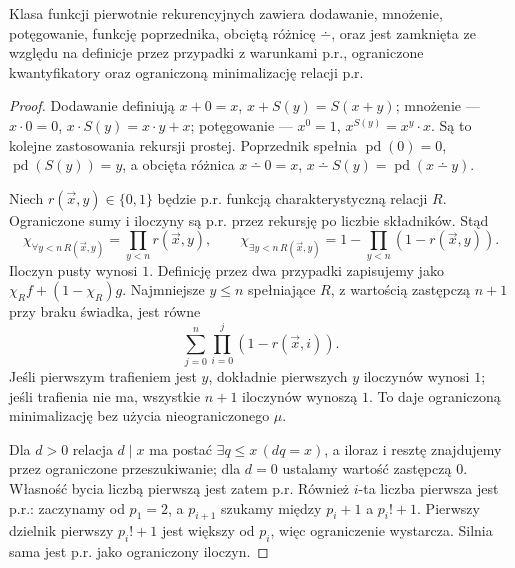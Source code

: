 \begin{lemat}[Zamkniętość p.r.]\label{res:5:8}
Klasa funkcji pierwotnie rekurencyjnych zawiera dodawanie, mnożenie, potęgowanie, funkcję poprzednika, obciętą różnicę $\dotminus$, oraz jest zamknięta ze względu na definicje przez przypadki z warunkami p.r., ograniczone kwantyfikatory oraz ograniczoną minimalizację relacji p.r.
\end{lemat}
\begin{proof}
Dodawanie definiują $x+0=x$, $x+S(y)=S(x+y)$; mnożenie --- $x\cdot0=0$, $x\cdot S(y)=x\cdot y+x$; potęgowanie --- $x^0=1$, $x^{S(y)}=x^y\cdot x$. Są to kolejne zastosowania rekursji prostej. Poprzednik spełnia $\operatorname{pd}(0)=0$, $\operatorname{pd}(S(y))=y$, a obcięta różnica $x\dotminus0=x$, $x\dotminus S(y)=\operatorname{pd}(x\dotminus y)$.

Niech $r(\vec x,y)\in\{0,1\}$ będzie p.r. funkcją charakterystyczną relacji $R$. Ograniczone sumy i iloczyny są p.r. przez rekursję po liczbie składników. Stąd
\[
\chi_{\forall y<n\,R(\vec x,y)}=\prod_{y<n}r(\vec x,y),\qquad
\chi_{\exists y<n\,R(\vec x,y)}=1-\prod_{y<n}(1-r(\vec x,y)).
\]
Iloczyn pusty wynosi $1$. Definicję przez dwa przypadki zapisujemy jako $\chi_R f+(1-\chi_R)g$. Najmniejsze $y\le n$ spełniające $R$, z wartością zastępczą $n+1$ przy braku świadka, jest równe
\[
\sum_{j=0}^{n}\prod_{i=0}^{j}(1-r(\vec x,i)).
\]
Jeśli pierwszym trafieniem jest $y$, dokładnie pierwszych $y$ iloczynów wynosi $1$; jeśli trafienia nie ma, wszystkie $n+1$ iloczynów wynoszą $1$. To daje ograniczoną minimalizację bez użycia nieograniczonego $\mu$.

Dla $d>0$ relacja $d\mid x$ ma postać $\exists q\le x\,(dq=x)$, a iloraz i resztę znajdujemy przez ograniczone przeszukiwanie; dla $d=0$ ustalamy wartość zastępczą $0$. Własność bycia liczbą pierwszą jest zatem p.r. Również $i$-ta liczba pierwsza jest p.r.: zaczynamy od $p_1=2$, a $p_{i+1}$ szukamy między $p_i+1$ a $p_i!+1$. Pierwszy dzielnik pierwszy $p_i!+1$ jest większy od $p_i$, więc ograniczenie wystarcza. Silnia sama jest p.r. jako ograniczony iloczyn.
\end{proof}

